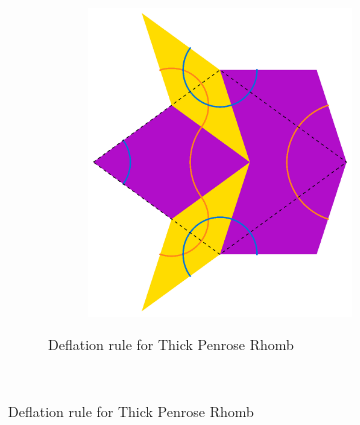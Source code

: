 \documentclass[
  oneside,
  11pt, a4paper,
  footinclude=true,
  headinclude=true,
  cleardoublepage=empty
]{scrbook}
\begin{document}
\begin{figure}[H]
\begin{subfigure}[t]{\textwidth}
\begin{subfigure}[t]{0.4\textwidth}
                \includegraphics[scale=0.4]{RhombFatSub}
        \end{subfigure}
        \caption{Deflation rule for Thick Penrose Rhomb}
        \label{fig:RhombSubThick}
        \end{subfigure}
        ~ %
          

\end{figure}
\end{document}
